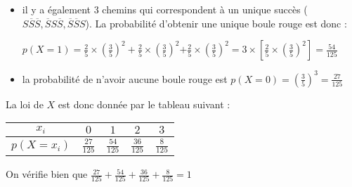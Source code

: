 {\begin{itemize}
          \par
          $p\left(X=2\right) =\left(\frac{2}{5}\right)^{2}\times \frac{3}{5}+\left(\frac{2}{5}\right)^{2}\times \frac{3}{5}$\nosp$+\left(\frac{2}{5}\right)^{2}\times \frac{3}{5}$\nosp$=3\times \left[\left(\frac{2}{5}\right)^{2}\times \frac{3}{5}\right]=\frac{36}{125}$
          \item il y a également 3 chemins qui correspondent à un unique succès ($S\overline S\overline S, \overline SS\overline S, \overline S\overline SS$). La probabilité d'obtenir une unique boule rouge est donc :
          \par
          $p\left(X=1\right) = \frac{2}{5}\times \left(\frac{3}{5}\right)^{2}+ \frac{2}{5}\times \left(\frac{3}{5}\right)^{2}$\nosp$+ \frac{2}{5}\times \left(\frac{3}{5}\right)^{2}$\nosp$=3\times \left[ \frac{2}{5}\times \left(\frac{3}{5}\right)^{2}\right]=\frac{54}{125}$
          \item la probabilité de n'avoir aucune boule rouge est  $p\left(X=0\right) =\left(\frac{3}{5}\right)^{3}=\frac{27}{125}$
     \end{itemize}
     La loi de $X$ est donc donnée par le tableau suivant :
 \begin{center}
     \begin{tabular}{|c|c|c|c|c|}%
          \hline
          \textbf{$x_{i}$}  & $0$  & $1$ & $2$ & $3$
          \\ \hline
          \textbf{$p\left(X=x_{i}\right)$}    &  $\frac{27}{125}$  &   $\frac{54}{125}$ &   $\frac{36}{125}$ &   $\frac{8}{125}$
          \\ \hline
     \end{tabular}
 \end{center}
     On vérifie bien que $\frac{27}{125}+\frac{54}{125}+\frac{36}{125}+\frac{8}{125}=1$
}
